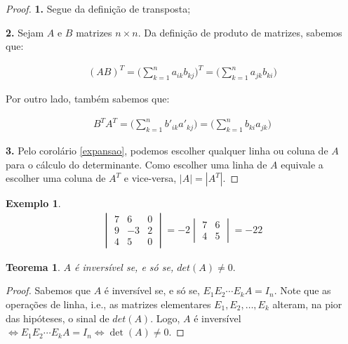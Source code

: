 \documentclass{article}
\newtheorem{theorem}{Teorema}[section]
\newtheorem*{example}{Exemplo}
\begin{document}
\begin{proof}
	\textbf{1.} Segue da definição de transposta;
	\par\vspace{0.4cm}\hspace{17pt}\textbf{2.} Sejam $A$ e $B$ matrizes $n\times n$. Da definição de produto de matrizes, sabemos que:
	
	\begin{align*}
	(AB)^T = \Bigg(\sum_{k=1}^{n} a_{ik}b_{kj} \Bigg)^T = \Bigg( \sum_{k=1}^{n} a_{jk}b_{ki} \Bigg)
	\end{align*}
	\par\vspace{0.3cm} Por outro lado, também sabemos que:
	
	\begin{align*}
	B^TA^T = \Bigg( \sum_{k=1}^{n}b'_{ik}a'_{kj} \Bigg) = \Bigg( \sum_{k=1}^{n}b_{ki}a_{jk} \Bigg)
	\end{align*}
	 
	\par\vspace{0.4cm}\hspace{17pt}\textbf{3.} Pelo corolário \ref{expansao}, podemos escolher qualquer linha ou coluna de $A$ para o cálculo do determinante. Como escolher uma linha de $A$ equivale a escolher uma coluna de $A^T$ e vice-versa, $|A| = |A^T|$.
\end{proof}

\begin{example}
	\begin{align*}
	\begin{vmatrix}
	7 & 6 & 0 \\
	9 & -3 & 2 \\
	4 & 5 & 0 
	\end{vmatrix} = -2\begin{vmatrix}
	7 & 6 \\
	4 & 5
	\end{vmatrix} = -22
	\end{align*}
\end{example}

\begin{theorem}
	$A$ é inversível se, e só se, $det(A)\neq 0.$
\end{theorem}

\begin{proof}
	Sabemos que $A$ é inversível se, e só se, $E_1E_2\cdots E_kA = I_n$. Note que as operações de linha, i.e., as matrizes elementares $E_1, E_2, \dots, E_k$ alteram, na pior das hipóteses, o sinal de $det(A)$. Logo, $A$ é inversível $\Leftrightarrow E_1E_2\cdots E_kA = I_n \Leftrightarrow \det(A)\neq 0$.
\end{proof}
\end{document}
